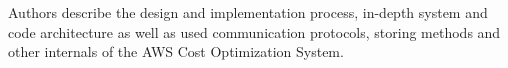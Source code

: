 %
%
%
%
%
%
%
%
%

Authors describe the design and implementation process, in-depth system and code architecture
as well as used communication protocols, storing methods and other internals of the AWS Cost Optimization System.

